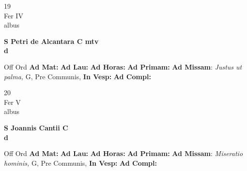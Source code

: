 \documentclass[10pt, openany]{book}
\begin{document}
        \begin{center}
            \begin{minipage}{3.5in}
                \vspace{2em}
                \begin{minipage}{0.5in}
                    {\Huge 19} \\
                    {\normalsize Fer IV} \\
                    {\normalsize albus}
                \end{minipage}
                \begin{minipage}{3.0in}
                    \textbf{ \large S Petri de Alcantara C mtv \\
                    \textnormal{\normalsize d}} \\ 
                \end{minipage}
                \begin{justify}Off Ord
                    \textbf{Ad Mat: }
                    \textbf{Ad Lau: }
                    \textbf{Ad Horas: }
                    \textbf{Ad Primam: }\textbf{Ad Missam}: \textit{Justus ut palma,} G, Pre Communis,  
                    \textbf{In Vesp: }
                    \textbf{Ad Compl: }
                \end{justify}
            \end{minipage}
        \end{center}
    
        \begin{center}
            \begin{minipage}{3.5in}
                \vspace{2em}
                \begin{minipage}{0.5in}
                    {\Huge 20} \\
                    {\normalsize Fer V} \\
                    {\normalsize albus}
                \end{minipage}
                \begin{minipage}{3.0in}
                    \textbf{ \large S Joannis Cantii C \\
                    \textnormal{\normalsize d}} \\ 
                \end{minipage}
                \begin{justify}Off Ord
                    \textbf{Ad Mat: }
                    \textbf{Ad Lau: }
                    \textbf{Ad Horas: }
                    \textbf{Ad Primam: }\textbf{Ad Missam}: \textit{Miseratio hominis,} G, Pre Communis,  
                    \textbf{In Vesp: }
                    \textbf{Ad Compl: }
                \end{justify}
            \end{minipage}
        \end{center}
    
\end{document}
